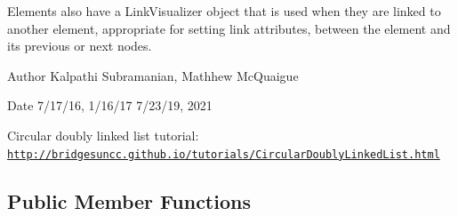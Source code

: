 Elements also have a Link\+Visualizer object that is used when they are linked to another element, appropriate for setting link attributes, between the element and its previous or next nodes.

\begin{DoxyAuthor}{Author}
Kalpathi Subramanian, Mathhew Mc\+Quaigue
\end{DoxyAuthor}
\begin{DoxyDate}{Date}
7/17/16, 1/16/17 7/23/19, 2021
\end{DoxyDate}
Circular doubly linked list tutorial\+: \href{http://bridgesuncc.github.io/tutorials/CircularDoublyLinkedList.html}{\tt http\+://bridgesuncc.\+github.\+io/tutorials/\+Circular\+Doubly\+Linked\+List.\+html} \subsection*{Public Member Functions}
